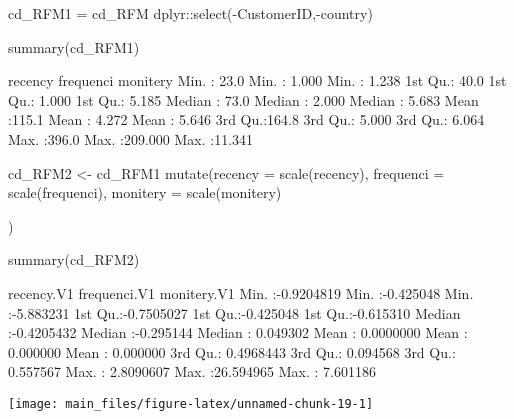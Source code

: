 \begin{Schunk}
\begin{Sinput}
cd_RFM1 = cd_RFM%>% 
dplyr::select(-CustomerID,-country)

summary(cd_RFM1)
\end{Sinput}
\begin{Soutput}
    recency        frequenci          monitery     
 Min.   : 23.0   Min.   :  1.000   Min.   : 1.238  
 1st Qu.: 40.0   1st Qu.:  1.000   1st Qu.: 5.185  
 Median : 73.0   Median :  2.000   Median : 5.683  
 Mean   :115.1   Mean   :  4.272   Mean   : 5.646  
 3rd Qu.:164.8   3rd Qu.:  5.000   3rd Qu.: 6.064  
 Max.   :396.0   Max.   :209.000   Max.   :11.341  
\end{Soutput}
\end{Schunk}

\begin{Schunk}
\begin{Sinput}
cd_RFM2 <- cd_RFM1 %>% 
mutate(recency = scale(recency),
       frequenci = scale(frequenci),
       monitery = scale(monitery)
  
)

summary(cd_RFM2)
\end{Sinput}
\begin{Soutput}
      recency.V1         frequenci.V1         monitery.V1    
 Min.   :-0.9204819   Min.   :-0.425048   Min.   :-5.883231  
 1st Qu.:-0.7505027   1st Qu.:-0.425048   1st Qu.:-0.615310  
 Median :-0.4205432   Median :-0.295144   Median : 0.049302  
 Mean   : 0.0000000   Mean   : 0.000000   Mean   : 0.000000  
 3rd Qu.: 0.4968443   3rd Qu.: 0.094568   3rd Qu.: 0.557567  
 Max.   : 2.8090607   Max.   :26.594965   Max.   : 7.601186  
\end{Soutput}
\end{Schunk}

\begin{Schunk}


\begin{center}\texttt{[image: main\_files/figure-latex/unnamed-chunk-19-1]} \end{center}

\end{Schunk}

